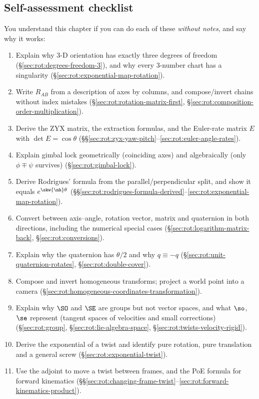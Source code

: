 \subsection{Self-assessment checklist}\label{sec:rot:self-assessment-checklist}
You understand this chapter if you can do each of these \emph{without notes}, and say why it works:
\begin{enumerate}[label=\arabic*.,itemsep=1pt]
\item Explain why 3-D orientation has exactly three degrees of freedom (\S\ref{sec:rot:degrees-freedom-3}), and why every 3-number chart has a singularity (\S\ref{sec:rot:exponential-map-rotation}).
\item Write $R_{AB}$ from a description of axes by columns, and compose/invert chains without index mistakes (\S\ref{sec:rot:rotation-matrix-first}, \S\ref{sec:rot:composition-order-multiplication}).
\item Derive the ZYX matrix, the extraction formulas, and the Euler-rate matrix $E$ with $\det E=\cos\theta$ (\S\S\ref{sec:rot:zyx-yaw-pitch}--\ref{sec:rot:euler-angle-rates}).
\item Explain gimbal lock geometrically (coinciding axes) and algebraically (only $\phi\mp\psi$ survives) (\S\ref{sec:rot:gimbal-lock}).
\item Derive Rodrigues' formula from the parallel/perpendicular split, and show it equals $e^{\skw{\nh}\theta}$ (\S\S\ref{sec:rot:rodrigues-formula-derived}--\ref{sec:rot:exponential-map-rotation}).
\item Convert between axis--angle, rotation vector, matrix and quaternion in both directions, including the numerical special cases (\S\ref{sec:rot:logarithm-matrix-back}, \S\ref{sec:rot:conversions}).
\item Explain why the quaternion has $\theta/2$ and why $q\equiv-q$ (\S\ref{sec:rot:unit-quaternion-rotates}, \S\ref{sec:rot:double-cover}).
\item Compose and invert homogeneous transforms; project a world point into a camera (\S\ref{sec:rot:homogeneous-coordinates-transformation}).
\item Explain why $\SO$ and $\SE$ are groups but not vector spaces, and what $\so$, $\se$ represent (tangent spaces of velocities and small corrections) (\S\ref{sec:rot:group}, \S\ref{sec:rot:lie-algebra-space}, \S\ref{sec:rot:twists-velocity-rigid}).
\item Derive the exponential of a twist and identify pure rotation, pure translation and a general screw (\S\ref{sec:rot:exponential-twist}).
\item Use the adjoint to move a twist between frames, and the PoE formula for forward kinematics (\S\S\ref{sec:rot:changing-frame-twist}--\ref{sec:rot:forward-kinematics-product}).
\end{enumerate}

